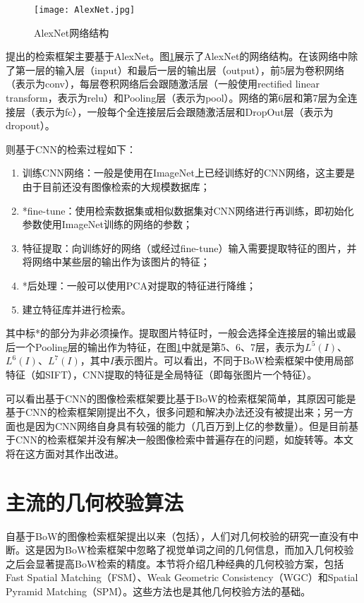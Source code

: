\begin{figure}[h]
	\centering
	\texttt{[image: AlexNet.jpg]}
	\caption{AlexNet网络结构}\label{fig:AlexNet}
\end{figure}

\cite{babenko2014neural}提出的检索框架主要基于AlexNet。图\ref{fig:AlexNet}展示了AlexNet\cite{krizhevsky2012imagenet}的网络结构。在该网络中除了第一层的输入层（input）和最后一层的输出层（output），前5层为卷积网络（表示为conv），每层卷积网络后会跟随激活层（一般使用rectified linear transform，表示为relu）和Pooling层（表示为pool）。网络的第6层和第7层为全连接层（表示为fc），一般每个全连接层后会跟随激活层和DropOut层（表示为dropout）。

则基于CNN的检索过程如下：
\begin{enumerate}
	\item 训练CNN网络：一般是使用在ImageNet上已经训练好的CNN网络，这主要是由于目前还没有图像检索的大规模数据库；
	\item *fine-tune：使用检索数据集或相似数据集对CNN网络进行再训练，即初始化参数使用ImageNet训练的网络的参数；
	\item 特征提取：向训练好的网络（或经过fine-tune）输入需要提取特征的图片，并将网络中某些层的输出作为该图片的特征；
	\item *后处理：一般可以使用PCA对提取的特征进行降维；
	\item 建立特征库并进行检索。
\end{enumerate}

其中标*的部分为非必须操作。提取图片特征时，一般会选择全连接层的输出或最后一个Pooling层的输出作为特征，在图\ref{fig:AlexNet}中就是第5、6、7层，表示为$L^5(I)$、$L^6(I)$、$L^7(I)$，其中$I$表示图片。可以看出，不同于BoW检索框架中使用局部特征（如SIFT），CNN提取的特征是全局特征（即每张图片一个特征）。

可以看出基于CNN的图像检索框架要比基于BoW的检索框架简单，其原因可能是基于CNN的检索框架刚提出不久，很多问题和解决办法还没有被提出来；另一方面也是因为CNN网络自身具有较强的能力（几百万到上亿的参数量）。但是目前基于CNN的检索框架并没有解决一般图像检索中普遍存在的问题，如旋转等。本文将在这方面对其作出改进。


\section{主流的几何校验算法}
自基于BoW的图像检索框架提出以来（包括\cite{sivic2003video}），人们对几何校验的研究一直没有中断。这是因为BoW检索框架中忽略了视觉单词之间的几何信息，而加入几何校验之后会显著提高BoW检索的精度。本节将介绍几种经典的几何校验方案，包括Fast Spatial Matching（FSM）\cite{philbin2007object}、Weak Geometric Consistency（WGC）\cite{jegou2008hamming}和Spatial Pyramid Matching（SPM）\cite{lazebnik2006beyond}。这些方法也是其他几何校验方法的基础。

